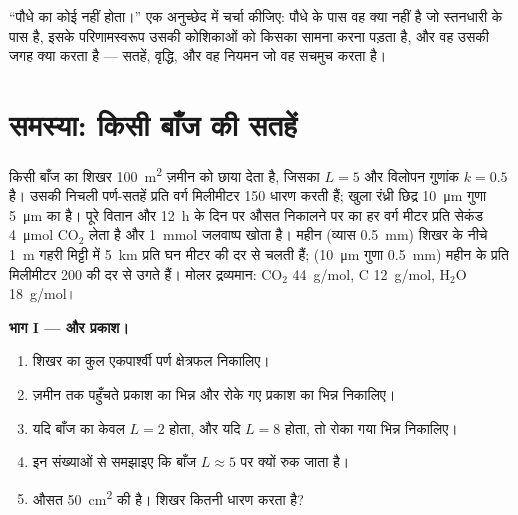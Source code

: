 \begin{exercise}[$\star\star\star$]\label{exo:b1:flowering-plant-organization:12}
``पौधे का कोई  नहीं होता।'' एक अनुच्छेद में चर्चा कीजिए:
पौधे के पास वह क्या नहीं है जो स्तनधारी के पास है, इसके परिणामस्वरूप
उसकी कोशिकाओं को किसका सामना करना पड़ता है, और वह उसकी जगह क्या करता है
--- सतहें, वृद्धि, और वह नियमन जो वह सचमुच करता है।
\end{exercise}

\section{समस्या: किसी बाँज की सतहें}

\begin{problem}
\label{pb:b1:flowering-plant-organization:1}
किसी बाँज का शिखर \qty{100}{m^2} ज़मीन को छाया देता है, जिसका  $L = 5$ और विलोपन गुणांक $k = 0.5$ है। उसकी निचली
पर्ण-सतहें प्रति वर्ग मिलीमीटर \qty{150}{}  धारण करती हैं; खुला
रंध्री छिद्र \qty{10}{\micro m} गुणा \qty{5}{\micro m} का है। पूरे
वितान और \qty{12}{h} के दिन पर औसत निकालने पर  का हर वर्ग मीटर
प्रति सेकंड \qty{4}{\micro mol} $\mathrm{CO_2}$ लेता है और \qty{1}{mmol}
जलवाष्प खोता है। महीन  (व्यास \qty{0.5}{mm}) शिखर के नीचे
\qty{1}{m} गहरी मिट्टी में \qty{5}{km} प्रति घन मीटर की दर से चलती हैं;
 (\qty{10}{\micro m} गुणा \qty{0.5}{mm}) महीन  के प्रति
मिलीमीटर \qty{200}{} की दर से उगते हैं। मोलर द्रव्यमान:
$\mathrm{CO_2}$ \qty{44}{g/mol}, C \qty{12}{g/mol},
$\mathrm{H_2O}$ \qty{18}{g/mol}।

\medskip
\noindent\textbf{भाग I ---  और प्रकाश।}
\begin{enumerate}
  \item शिखर का कुल एकपार्श्वी पर्ण क्षेत्रफल निकालिए।
  \item ज़मीन तक पहुँचते प्रकाश का भिन्न और रोके गए प्रकाश का भिन्न
        निकालिए।
  \item यदि बाँज का केवल $L = 2$ होता, और यदि $L = 8$ होता, तो रोका गया
        भिन्न निकालिए।
  \item इन संख्याओं से समझाइए कि बाँज $L \approx 5$ पर क्यों रुक जाता
        है।
  \item औसत  \qty{50}{cm^2} की है। शिखर कितनी  धारण करता
        है?
\end{enumerate}


\end{problem}
